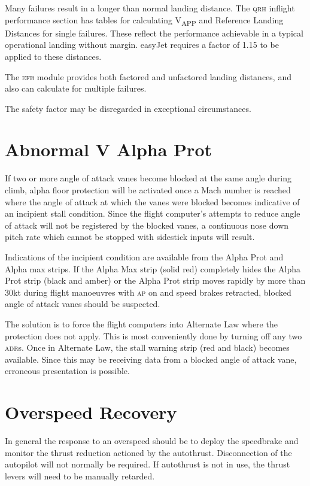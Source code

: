 \documentclass[a5paper,11pt,twoside]{book}
\newcommand{\ac}[1]{{\scshape\MakeLowercase{#1}}}
\newcommand{\inlcite}[1]{{\ac{#1}}}
\newcommand{\multicite}[1]{%
  \nopagebreak
  \noindent{{\color{blue}\footnotesize[ \inlcite{#1} ]}}
}
\newcommand{\V}[1]{V\textsubscript{#1}}
\begin{document}
Many failures result in a longer than normal landing distance. The \ac{QRH}
inflight performance section has tables for calculating \V{APP} and Reference
Landing Distances for single failures. These reflect the performance achievable
in a typical operational landing without margin. easyJet requires a factor of
1.15 to be applied to these distances.

The \ac{EFB} module provides both factored and unfactored landing distances, and
also can calculate for multiple failures.

The safety factor may be disregarded in exceptional circumstances.

\multicite{QRH~IFP, FCOM~PER.LDG, EOMB~4.14.2}

\section{Abnormal V Alpha Prot}

If two or more angle of attack vanes become blocked at the same angle during
climb, alpha floor protection will be activated once a Mach number is reached
where the angle of attack at which the vanes were blocked becomes indicative of
an incipient stall condition. Since the flight computer's attempts to reduce
angle of attack will not be registered by the blocked vanes, a continuous nose
down pitch rate which cannot be stopped with sidestick inputs will result.

Indications of the incipient condition are available from the Alpha Prot and
Alpha max strips. If the Alpha Max strip (solid red) completely hides the Alpha
Prot strip (black and amber) or the Alpha Prot strip moves rapidly by more than
30kt during flight manoeuvres with \ac{AP} on and speed brakes retracted, blocked
angle of attack vanes should be suspected.

The solution is to force the flight computers into Alternate Law where the
protection does not apply. This is most conveniently done by turning off any two
\ac{ADR}s. Once in Alternate Law, the stall warning strip (red and black)
becomes available. Since this may be receiving data from a blocked angle of
attack vane, erroneous presentation is possible.

\multicite{OEBPROC-48}

\section{Overspeed Recovery}

In general the response to an overspeed should be to deploy the speedbrake and
monitor the thrust reduction actioned by the autothrust. Disconnection of the
autopilot will not normally be required. If autothrust is not in use, the thrust
levers will need to be manually retarded.
\end{document}
